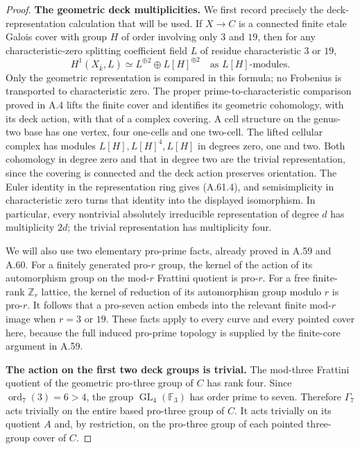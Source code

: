 \begin{proof}
\medskip\noindent\textbf{The geometric deck multiplicities.}
We first record precisely the deck-representation
calculation that will be used.  If $X\to C$ is a
connected finite etale Galois cover with group $H$
of order involving only $3$ and $19$, then for any
characteristic-zero splitting coefficient field $L$
of residue characteristic $3$ or $19$,
\[
 H^1(X_{\bar k},L)\simeq
                    L^{\oplus2}\oplus L[H]^{\oplus2}
                   \quad\text{as $L[H]$-modules}.          \tag{A.61.4}
\]
Only the geometric representation is compared in this
formula; no Frobenius is transported to characteristic
zero.  The proper prime-to-characteristic comparison
proved in A.4 lifts the finite cover and identifies
its geometric cohomology, with its deck action, with
that of a complex covering.  A cell structure on the
genus-two base has one vertex, four one-cells and one
two-cell.  The lifted cellular complex has modules
$L[H],L[H]^4,L[H]$ in degrees zero, one and two.
Both cohomology in degree zero and that in degree two
are the trivial representation, since the covering
is connected and the deck action preserves orientation.
The Euler identity in the representation ring gives
(A.61.4), and semisimplicity in characteristic zero
turns that identity into the displayed isomorphism.
In particular, every nontrivial absolutely irreducible
representation of degree $d$ has multiplicity $2d$;
the trivial representation has multiplicity four.

We will also use two elementary pro-prime facts,
already proved in A.59 and A.60.  For a finitely
generated pro-$r$ group, the kernel of the action of
its automorphism group on the mod-$r$ Frattini quotient
is pro-$r$.  For a free finite-rank $\mathbb Z_r$
lattice, the kernel of reduction of its automorphism
group modulo $r$ is pro-$r$.  It follows that a
pro-seven action embeds into the relevant finite
mod-$r$ image when $r=3$ or $19$.  These facts apply
to every curve and every pointed cover here, because
the full induced pro-prime topology is supplied by
the finite-core argument in A.59.

\medskip\noindent\textbf{The action on the first two deck groups is trivial.}
The mod-three Frattini quotient of the geometric
pro-three group of $C$ has rank four.  Since
$\operatorname{ord}_7(3)=6>4$, the group
$\operatorname{GL}_4(\mathbb F_3)$ has order prime to
seven.  Therefore $\Gamma_7$ acts trivially on the
entire based pro-three group of $C$.  It acts
trivially on its quotient $A$ and, by restriction,
on the pro-three group of each pointed three-group
cover of $C$.


\end{proof}
